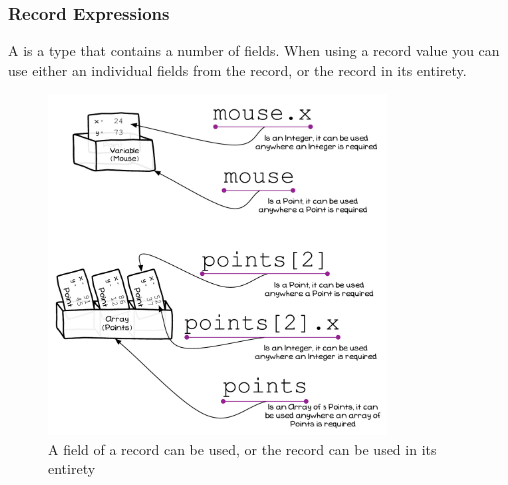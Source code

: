 \clearpage
\subsubsection{Record Expressions} %
\label{ssub:record_expressions}

A  is a type that contains a number of fields. When using a record value you can use either an individual fields from the record, or the record in its entirety.

\begin{figure}[h]
   \centering
   \includegraphics[width=0.8\textwidth]{./topics/type-decl/diagrams/RecordExpr} 
   \caption{A field of a record can be used, or the record can be used in its entirety}
   \label{fig:record-expr}
\end{figure}

